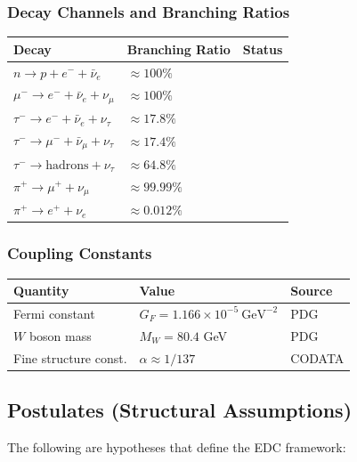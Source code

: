 \subsubsection{Decay Channels and Branching Ratios}

\begin{center}
\begin{tabular}{lll}
\toprule
\textbf{Decay} & \textbf{Branching Ratio} & \textbf{Status} \\
\midrule
$n \to p + e^- + \bar\nu_e$ & $\approx 100\%$ & \tagBL{} \\
$\mu^- \to e^- + \bar\nu_e + \nu_\mu$ & $\approx 100\%$ & \tagBL{} \\
$\tau^- \to e^- + \bar\nu_e + \nu_\tau$ & $\approx 17.8\%$ & \tagBL{} \\
$\tau^- \to \mu^- + \bar\nu_\mu + \nu_\tau$ & $\approx 17.4\%$ & \tagBL{} \\
$\tau^- \to \text{hadrons} + \nu_\tau$ & $\approx 64.8\%$ & \tagBL{} \\
$\pi^+ \to \mu^+ + \nu_\mu$ & $\approx 99.99\%$ & \tagBL{} \\
$\pi^+ \to e^+ + \nu_e$ & $\approx 0.012\%$ & \tagBL{} \\
\bottomrule
\end{tabular}
\end{center}

\subsubsection{Coupling Constants}

\begin{center}
\begin{tabular}{lll}
\toprule
\textbf{Quantity} & \textbf{Value} & \textbf{Source} \\
\midrule
Fermi constant & $G_F = 1.166 \times 10^{-5}~\text{GeV}^{-2}$ & PDG \\
$W$ boson mass & $M_W = 80.4$ GeV & PDG \\
Fine structure const. & $\alpha \approx 1/137$ & CODATA \\
\bottomrule
\end{tabular}
\end{center}

\subsection{Postulates (Structural Assumptions)}

The following are hypotheses that define the EDC framework:

